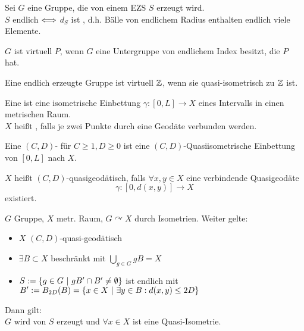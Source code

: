 \documentclass{article}
\begin{document}
\Satz{}
Sei $G$ eine Gruppe, die von einem EZS $S$ erzeugt wird.\\
$S$ endlich $\overset{}{\Longleftrightarrow}$ $d_S$ ist , d.h. Bälle von endlichem Radius enthalten endlich viele Elemente. 



$G$ ist virtuell $P$, wenn $G$ eine Untergruppe von endlichem Index besitzt, die $P$ hat.


\Satz{}
Eine endlich erzeugte Gruppe ist virtuell $\mathbb{Z}$, wenn sie quasi-isometrisch zu $\mathbb{Z}$ ist.





Eine  ist eine isometrische Einbettung $\gamma : [0,L] \rightarrow X$ eines Intervalls in einen metrischen Raum.\\
$X$ heißt , falls je zwei Punkte durch eine Geodäte verbunden werden.


Eine $(C,D)$- für $C\geq 1, D \geq 0$ ist eine $(C,D)$-Quasiisometrische Einbettung von $[0,L]$ nach $X$.

$X$ heißt $(C,D)$-quasigeodätisch, falls $\forall x,y \in X$ eine verbindende Quasigeodäte \[\gamma :[0,d(x,y)] \rightarrow X \] existiert.


$G$ Gruppe, $X$ metr. Raum, $G\curvearrowright X$ durch Isometrien. Weiter gelte:
\begin{itemize}
\item $X$ $(C,D)$-quasi-geodätisch
\item $\exists B \subset X$ beschränkt mit $\bigcup_{g\in G}gB = X$
\item $S:=\set{g\in G}{gB' \cap B' \neq \emptyset}$ ist endlich mit $B' := B_{2D}(B) = \set{x\in X}{\exists y \in B: d(x,y) \leq 2D}$
\end{itemize}
Dann gilt:\\
$G$ wird von $S$ erzeugt und
$\forall x \in X$ ist 
eine Quasi-Isometrie.
\end{document}
